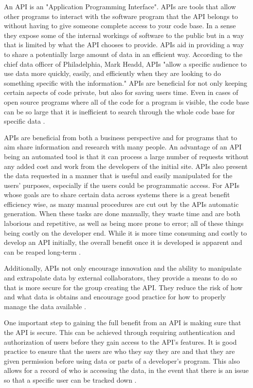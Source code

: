 		An API is an "Application Programming Interface". APIs are tools that 
		allow other programs to interact with the software program that the API 
		belongs to without having to give someone complete access to your code 
		base. In a sense they expose some of the internal workings of software 
		to the public but in a way that is limited by what the API chooses to 
		provide. APIs aid in providing a way to share a potentially large 
		amount of data in an efficient way. According to the chief data officer 
		of Philadelphia, Mark Headd, APIs "allow a specific audience to use data
		more quickly, easily, and efficiently when they are looking to do 
		something specific with the information." APIs are beneficial for not 
		only keeping certain aspects of code private, but also for saving users 
		time. Even in cases of open source programs where all of the code for a 
		program is visible, the code base can be so large that it is inefficient 
		to search through the whole code base for specific data \cite{govapi}. 

		APIs are beneficial from both a business perspective and for programs 
		that to aim share information and research with many people. An 
		advantage of an API being an automated tool is that it can process a 
		large number of requests without any added cost and work from the 
		developers of the initial site. APIs also present the data requested in 
		a manner that is useful and easily manipulated for the users' purposes, 
		especially if the users could be programmatic access. For APIs whose 
		goals are to share certain data across systems there is a great benefit 
		efficiency wise, as many manual procedures are cut out by the APIs 
		automatic generation. When these tasks are done manually, they waste 
		time and are both laborious and repetitive, as well as being more prone 
		to error; all of these things being costly on the developer end. While 
		it is more time consuming and costly to develop an API initially, the 
		overall benefit once it is developed is apparent and can be reaped 
		long-term \cite{govapi}.

		Additionally, APIs not only encourage innovation and the ability to 
		manipulate and extrapolate data by external collaborators, they provide 
		a means to do so that is more secure for the group creating the API. 
		They reduce the risk of how and what data is obtains and encourage good 
		practice for how to properly manage the data available \cite{readwrite}.

		One important step to gaining the full benefit from an API is making 
		sure that the API is secure. This can be achieved through requiring 
		authentication and authorization of users before they gain access to the
		API's features. It is good practice to ensure that the users are who 
		they say they are and that they are given permission before using data 
		or parts of a developer's program. This also allows for a record of who 
		is accessing the data, in the event that there is an issue so that a 
		specific user can be tracked down \cite{jisc}.

